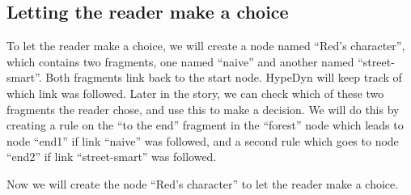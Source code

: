 \documentclass{article}
\begin{document}
\subsection{Letting the reader make a choice}

To let the reader make a choice, we will create a node named ``Red's character'', which contains two fragments, one named ``naive'' and another named ``street-smart''. Both fragments link back to the start node. HypeDyn will keep track of which link was followed. Later in the story, we can check which of these two fragments the reader chose, and use this to make a decision. We will do this by creating a rule on the
``to the end'' fragment in the ``forest'' node which leads to node ``end1'' if link ``naive'' was followed, and a second rule which goes to node ``end2'' if link ``street-smart'' was followed.

Now we will create the node ``Red's character'' to let the reader make a
choice.
\end{document}
